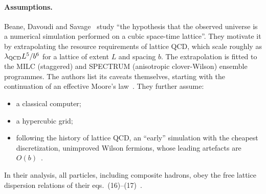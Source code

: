 \paragraph{Assumptions.}
Beane, Davoudi and Savage~\cite{Beane2014constraints} study ``the hypothesis that the observed universe is a numerical simulation performed on a cubic space-time lattice''. They motivate it by extrapolating the resource requirements of lattice QCD, which scale roughly as $\lambda_{\rm QCD}L^5/b^6$ for a lattice of extent $L$ and spacing $b$. The extrapolation is fitted to the MILC (staggered) and SPECTRUM (anisotropic clover-Wilson) ensemble programmes. The authors list its caveats themselves, starting with the continuation of an effective Moore's law~\cite[Sec.~I]{Beane2014constraints}. They further assume:
\begin{itemize}
\item a classical computer;
\item a hypercubic grid;
\item following the history of lattice QCD, an ``early'' simulation with the cheapest discretization, unimproved Wilson fermions, whose leading artefacts are $O(b)$~\cite[Secs.~I--II]{Beane2014constraints}.
\end{itemize}
In their analysis, all particles, including composite hadrons, obey the free lattice dispersion relations of their eqs.~(16)--(17)~\cite[Sec.~IV]{Beane2014constraints}.

